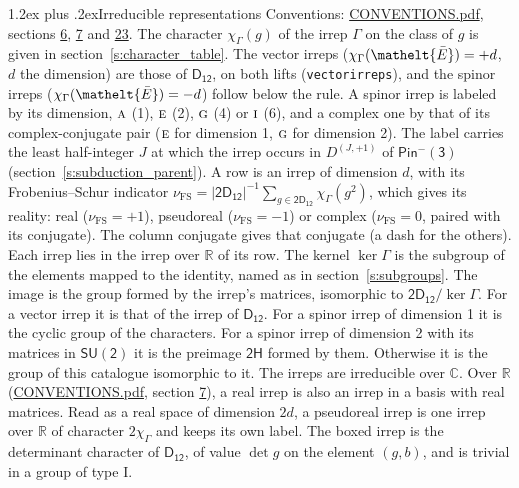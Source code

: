 \documentclass[10pt,a4paper]{article}
\makeatletter
\renewcommand\section{\@startsection{section}{1}{\z@}{-3ex plus -1ex minus -.2ex}%
  {1.2ex plus .2ex}{\normalfont\large\sffamily\bfseries\color{parttitle}}}
\numberwithin{equation}{section}
\newcommand{\eltfont}[1]{{\let\sigma\eltsigma\mathelt{#1}}}
\newcommand{\grp}[1]{\mathsf{#1}}
\newcommand{\irr}[1]{\text{\normalfont\scshape #1}}
\newcommand{\elt}[1]{\eltfont{#1}}
\newcommand{\irrJp}[2]{D^{(#1,#2)}}
\newcommand{\irchar}[1]{\chi_{#1}}
\newcommand{\fsind}{\nu_{\mathrm{FS}}}
\newcommand{\barred}[1]{\bar{#1}}
\makeatother
\begin{document}
\section{Irreducible representations}\label{s:irreps}
Conventions: \href{../../CONVENTIONS.pdf}{CONVENTIONS.pdf}, sections \href{../../../rotation/CONVENTIONS.pdf\#conv.6}{6}, \href{../../../rotation/CONVENTIONS.pdf\#conv.7}{7} and \href{../../CONVENTIONS.pdf\#conv.23}{23}.
\leavevmode\label{n:function.character}\label{n:irrep.Gamma}The character $\irchar{\Gamma}(g)$ of the irrep $\Gamma$ on the class of $g$ is given in section~\ref{s:character_table}. \label{n:index.dimension}The vector irreps ($\irchar{\Gamma}(\elt{\barred{E}}) = +d$, $d$ the dimension) are those of \href{../../../rotation/data/pdf/D12.pdf}{$\grp{D_{12}}$}, on both lifts (\texttt{vectorirreps}), and the spinor irreps ($\irchar{\Gamma}(\elt{\barred{E}}) = -d$) follow below the rule. A spinor irrep is labeled by its dimension, $\irr{a}$ (1), $\irr{e}$ (2), $\irr{g}$ (4) or $\irr{i}$ (6), and a complex one by that of its complex-conjugate pair ($\irr{e}$ for dimension 1, $\irr{g}$ for dimension 2). The label carries the least half-integer $J$ at which the irrep occurs in $\irrJp{J}{+1}$ of $\grp{Pin^{-}(3)}$ (section~\ref{s:subduction_parent}).
\leavevmode\label{n:index.frobenius}\label{n:head.irrep}\label{n:head.reality}A row is an irrep of dimension $d$, with its Frobenius--Schur indicator $\fsind = |\grp{2D_{12}}|^{-1}\allowbreak\sum_{g\in\grp{2D_{12}}}\irchar{\Gamma}(g^2)$, which gives its reality: real ($\fsind = +1$), pseudoreal ($\fsind = -1$) or complex ($\fsind = 0$, paired with its conjugate). \label{n:head.conjugate}The column conjugate gives that conjugate (a dash for the others). \label{n:head.over.real}Each irrep lies in the irrep over $\mathbb{R}$ of its row. \label{n:head.kernel}The kernel $\ker\Gamma$ is the subgroup of the elements mapped to the identity, named as in section~\ref{s:subgroups}. \label{n:head.image}The image is the group formed by the irrep's matrices, isomorphic to $\grp{2D_{12}}/\ker\Gamma$. For a vector irrep it is that of the irrep of \href{../../../rotation/data/pdf/D12.pdf}{$\grp{D_{12}}$}. For a spinor irrep of dimension 1 it is the cyclic group of the characters. For a spinor irrep of dimension 2 with its matrices in $\grp{SU(2)}$ it is the preimage $\grp{2H}$ formed by them. Otherwise it is the group of this catalogue isomorphic to it. The irreps are irreducible over $\mathbb{C}$. Over $\mathbb{R}$ (\href{../../CONVENTIONS.pdf}{CONVENTIONS.pdf}, section \href{../../../rotation/CONVENTIONS.pdf\#conv.7}{7}), a real irrep is also an irrep in a basis with real matrices. Read as a real space of dimension $2d$, a pseudoreal irrep is one irrep over $\mathbb{R}$ of character $2\irchar{\Gamma}$ and keeps its own label. \label{n:mark.determinant}The boxed irrep is the determinant character of \href{../../../rotation/data/pdf/D12.pdf}{$\grp{D_{12}}$}, of value $\det g$ on the element $(g, b)$, and is trivial in a group of type I.
\end{document}
